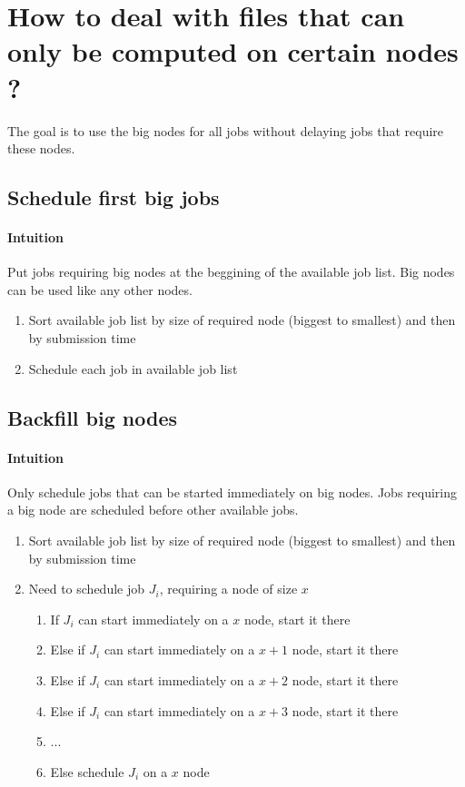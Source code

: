 \documentclass[a4paper]{article}
\begin{document}
\section{How to deal with files that can only be computed on certain nodes ?}
The goal is to use the big nodes for all jobs without delaying jobs that require these nodes.

\subsection{Schedule first big jobs}
\paragraph{Intuition} Put jobs requiring big nodes at the beggining of the available job list.
Big nodes can be used like any other nodes.
\begin{enumerate}
	\item Sort available job list by size of required node (biggest to smallest) and then by submission time
	\item Schedule each job in available job list
\end{enumerate}

\subsection{Backfill big nodes}
\paragraph{Intuition} Only schedule jobs that can be started immediately on big nodes.
Jobs requiring a big node are scheduled before other available jobs.
\begin{enumerate}
	\item Sort available job list by size of required node (biggest to smallest) and then by submission time
	\item Need to schedule job $J_i$, requiring a node of size $x$
	\begin{enumerate}
		\item If $J_i$ can start immediately on a $x$ node, start it there
		\item Else if $J_i$ can start immediately on a $x+1$ node, start it there
		\item Else if $J_i$ can start immediately on a $x+2$ node, start it there
		\item Else if $J_i$ can start immediately on a $x+3$ node, start it there
		\item ...
		\item Else schedule $J_i$ on a $x$ node
	\end{enumerate}
\end{enumerate}
\end{document}

